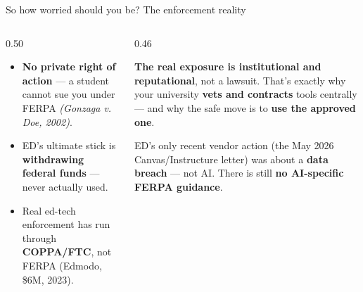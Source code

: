 \documentclass[aspectratio=169, 10pt]{beamer}
\newcommand{\cmcite}[1]{{\scriptsize\color{CoolGray}\textit{#1}}}
\begin{document}
\begin{frame}{So how worried should you be? The enforcement reality}
\begin{columns}[T]
\begin{column}{0.50\textwidth}
\begin{tcolorbox}[keybox, title={\faBalanceScale\quad How FERPA is enforced}, top=3pt, bottom=3pt]
\small
\begin{itemize}\setlength{\itemsep}{2pt}
  \item \textbf{No private right of action} --- a student cannot sue you under FERPA \cmcite{(\textit{Gonzaga v. Doe}, 2002)}.
  \item ED's ultimate stick is \textbf{withdrawing federal funds} --- never actually used.
  \item Real ed-tech enforcement has run through \textbf{COPPA/FTC}, not FERPA (Edmodo, \$6M, 2023).
\end{itemize}
\end{tcolorbox}
\end{column}
\begin{column}{0.46\textwidth}
\begin{tcolorbox}[accentbox]
\small
\textbf{The real exposure is institutional and reputational}, not a lawsuit.
\vskip3pt
That's exactly why your university \textbf{vets and contracts} tools centrally --- and why the safe move is to \textbf{use the approved one}.
\end{tcolorbox}
\vskip3pt
\begin{tcolorbox}[quotebox, top=2pt, bottom=2pt]
\scriptsize ED's only recent vendor action (the May 2026 Canvas/Instructure letter) was about a \textbf{data breach} --- not AI. There is still \textbf{no AI-specific FERPA guidance}.
\end{tcolorbox}
\end{column}
\end{columns}
\end{frame}
\end{document}
